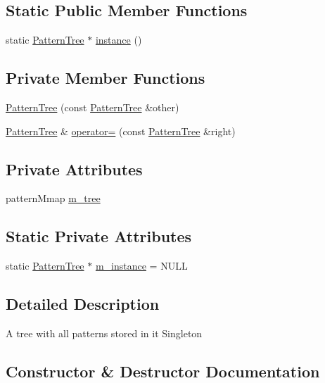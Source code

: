 \subsection*{Static Public Member Functions}
\begin{DoxyCompactItemize}
\item 
static \hyperlink{class_pattern_tree}{Pattern\+Tree} $\ast$ \hyperlink{class_pattern_tree_ae3cb1d962789f1bfe37994eec207d493}{instance} ()
\end{DoxyCompactItemize}
\subsection*{Private Member Functions}
\begin{DoxyCompactItemize}
\item 
\hyperlink{class_pattern_tree_af84e0bf107c0fda11f1c971bfe3d9c4f}{Pattern\+Tree} (const \hyperlink{class_pattern_tree}{Pattern\+Tree} \&other)
\item 
\hyperlink{class_pattern_tree}{Pattern\+Tree} \& \hyperlink{class_pattern_tree_ad1ece378133ff4abb282cea9204b0ccc}{operator=} (const \hyperlink{class_pattern_tree}{Pattern\+Tree} \&right)
\end{DoxyCompactItemize}
\subsection*{Private Attributes}
\begin{DoxyCompactItemize}
\item 
pattern\+Mmap \hyperlink{class_pattern_tree_a8aa612fc369e9106116ad8e3e5b02021}{m\+\_\+tree}
\end{DoxyCompactItemize}
\subsection*{Static Private Attributes}
\begin{DoxyCompactItemize}
\item 
static \hyperlink{class_pattern_tree}{Pattern\+Tree} $\ast$ \hyperlink{class_pattern_tree_a84a86ffd132359390369421d1fb4c594}{m\+\_\+instance} = N\+U\+LL
\end{DoxyCompactItemize}


\subsection{Detailed Description}
A tree with all patterns stored in it Singleton 

\subsection{Constructor \& Destructor Documentation}
